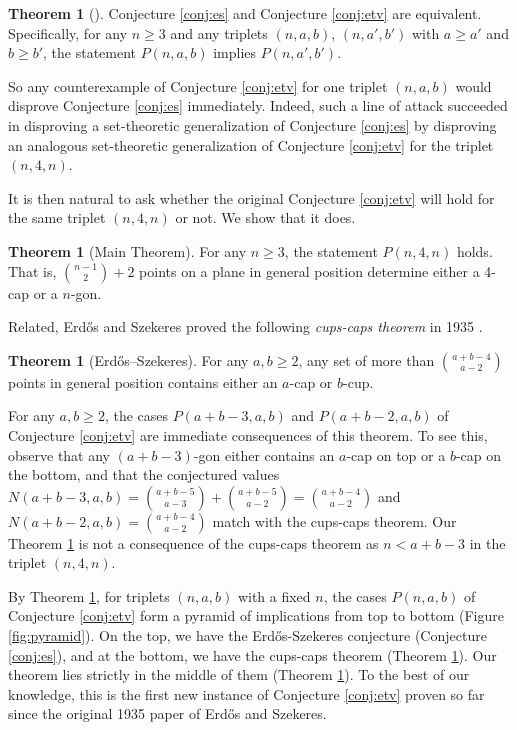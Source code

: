 \documentclass{amsart}
\theoremstyle{definition}
\newtheorem{theorem}[thm]{Theorem}
\numberwithin{thm}{section}
\begin{document}
\begin{theorem}[\cite{erdos1996ramsey}]
\label{thm:etv}
Conjecture \ref{conj:es} and Conjecture \ref{conj:etv} are equivalent.
Specifically, for any $n \geq 3$ and any triplets $(n, a, b)$, $(n, a', b')$ with $a \geq a'$ and $b \geq b'$,
the statement $P(n, a, b)$ implies $P(n, a', b')$.
\end{theorem}

So any counterexample of Conjecture \ref{conj:etv} for one triplet $(n, a, b)$ would disprove Conjecture \ref{conj:es} immediately.
Indeed, such a line of attack \cite{balko2017sat} succeeded in disproving a set-theoretic generalization \cite{szekeres2006computer} of Conjecture \ref{conj:es}  by disproving an analogous set-theoretic generalization of Conjecture \ref{conj:etv} for the triplet $(n, 4, n)$.

It is then natural to ask whether the original Conjecture \ref{conj:etv} will hold for the same triplet $(n, 4, n)$ or not.
We show that it does.

\begin{theorem}[Main Theorem]
\label{thm:main}
	For any $n \geq 3$, the statement $P(n, 4, n)$ holds.
	That is, $\binom{n - 1}{2} + 2$ points on a plane in general position determine either a 4-cap or a $n$-gon.
\end{theorem}

Related, Erd\H{o}s and Szekeres proved the following \emph{cups-caps theorem} in 1935 \cite{erdos1935combinatorial}.
\begin{theorem}[Erd\H{o}s–Szekeres]
\label{thm:capcup}
For any $a, b \geq 2$, any set of more than $\binom{a+b-4}{a-2}$ points in general position contains either an $a$-cap or $b$-cup.
\end{theorem}
For any $a, b \geq 2$, the cases $P(a + b - 3, a, b)$ and $P(a + b - 2, a, b)$ of Conjecture \ref{conj:etv} are immediate consequences of this theorem. 
To see this, observe that any $(a + b - 3)$-gon either contains an $a$-cap on top or a $b$-cap on the bottom, and that the conjectured values $N(a + b - 3, a, b) = \binom{a+b-5}{a-3} + \binom{a+b-5}{a-2} = \binom{a+b-4}{a-2}$ and $N(a + b - 2, a, b) = \binom{a+b-4}{a-2}$ match with the cups-caps theorem.
Our Theorem \ref{thm:main} is not a consequence of the cups-caps theorem as $n < a + b - 3$ in the triplet $(n, 4, n)$.

By Theorem \ref{thm:etv}, for triplets $(n, a, b)$ with a fixed $n$, the cases $P(n, a, b)$ of Conjecture \ref{conj:etv} form a pyramid of implications from top to bottom (Figure \ref{fig:pyramid}).
On the top, we have the Erd\H{o}s-Szekeres conjecture (Conjecture \ref{conj:es}),
and at the bottom, we have the cups-caps theorem (Theorem \ref{thm:capcup}).
Our theorem lies strictly in the middle of them (Theorem \ref{thm:main}).
To the best of our knowledge, this is the first new instance of Conjecture \ref{conj:etv} proven so far since the original 1935 paper \cite{erdos1935combinatorial} of Erdős and Szekeres.
\end{document}
